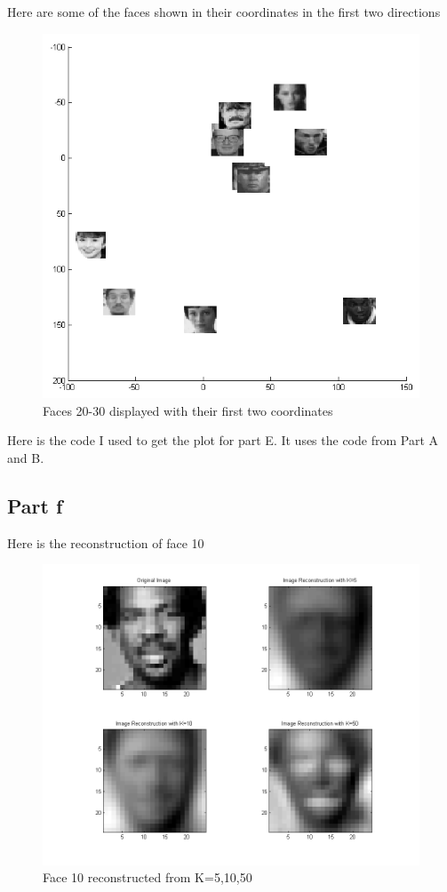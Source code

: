 \documentclass[twoside,11pt]{article}
\theoremstyle{definition}
\begin{document}
Here are some of the faces shown in their coordinates in the first two directions\\
\begin{figure}[h!]
\centering
\includegraphics[width=6 in]{prob3PartE.png}
\caption{Faces 20-30 displayed with their first two coordinates}
\end{figure}
\newpage
Here is the code I used to get the plot for part E. It uses the code from Part A and B.\\


\newpage

\subsection*{Part f}

Here is the reconstruction of face 10 \\
\begin{figure}[h!]
\centering
\includegraphics[width=6 in]{prob3PartF_face10.png}
\caption{Face 10 reconstructed from K=5,10,50}
\end{figure}
\end{document}
